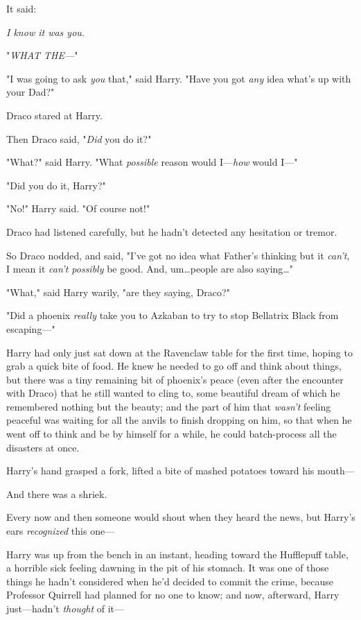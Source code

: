 It said:

\emph{I know it was you.}

"\emph{WHAT THE—}"

"I was going to ask \emph{you} that," said Harry. "Have you got \emph{any} idea
what's up with your Dad?"

Draco stared at Harry.

Then Draco said, "\emph{Did} you do it?"

"What?" said Harry. "What \emph{possible} reason would I—\emph{how} would
I—"

"Did you do it, Harry?"

"No!" Harry said. "Of course not!"

Draco had listened carefully, but he hadn't detected any hesitation or tremor.

So Draco nodded, and said, "I've got no idea what Father's thinking but it
\emph{can't}, I mean it \emph{can't possibly} be good. And, um…people
are also saying…"

"What," said Harry warily, "are they saying, Draco?"

"Did a phoenix \emph{really} take you to Azkaban to try to stop Bellatrix Black
from escaping—"

Harry had only just sat down at the Ravenclaw table for the first time, hoping
to grab a quick bite of food. He knew he needed to go off and think about
things, but there was a tiny remaining bit of phoenix's peace (even after the
encounter with Draco) that he still wanted to cling to, some beautiful dream of
which he remembered nothing but the beauty; and the part of him that
\emph{wasn't} feeling peaceful was waiting for all the anvils to finish
dropping on him, so that when he went off to think and be by himself for a
while, he could batch-process all the disasters at once.

Harry's hand grasped a fork, lifted a bite of mashed potatoes toward his
mouth—

And there was a shriek.

Every now and then someone would shout when they heard the news, but Harry's
ears \emph{recognized} this one—

Harry was up from the bench in an instant, heading toward the Hufflepuff table,
a horrible sick feeling dawning in the pit of his stomach. It was one of those
things he hadn't considered when he'd decided to commit the crime, because
Professor Quirrell had planned for no one to know; and now, afterward, Harry
just—hadn't \emph{thought} of it—

